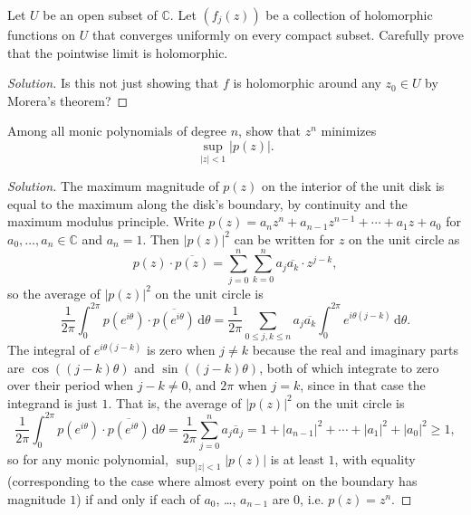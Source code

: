 \documentclass[10pt]{article}
\providecommand{\ol}{\overline}
\newcommand{\dd}{\,\mathrm{d}}
\providecommand{\CC}{\mathbb C}
\newenvironment{soln}{\begin{proof}[Solution]}{\end{proof}}
\providecommand{\abs}[1]{\left\lvert #1\right\rvert}
\begin{document}
\begin{problem}
[2026 J-II-4]
Let $U$ be an open subset of $\mathbb{C}$. Let $(f_j(z))$ be a collection of holomorphic functions on $U$ that converges uniformly on every compact subset. Carefully prove that the pointwise limit is holomorphic.
\end{problem}

\begin{soln}
    Is this not just showing that $f$ is holomorphic
    around any $z_0\in U$ by Morera's theorem?
\end{soln}



\begin{problem}
[2025 A-I-3]
Among all monic polynomials of degree $n$, show that $z^n$ minimizes
$$
\sup_{|z|<1}|p(z)|.
$$
\end{problem}

\begin{soln}
    The maximum magnitude of $p(z)$ on the interior of the unit disk
    is equal to the maximum along the disk's boundary,
    by continuity and the maximum modulus principle.
    Write $p(z) = a_nz^n + a_{n-1}z^{n-1} + \cdots + a_1z + a_0$
    for $a_0,\dots,a_n\in\CC$ and $a_n = 1$.
    Then $\abs{p(z)}^2$ can be written for $z$ on the unit circle as
    \begin{equation*}
	p(z)\cdot\ol{p(z)}
	= \sum_{j=0}^n\sum_{k=0}^n a_j\ol{a_k}\cdot z^{j-k},
    \end{equation*}
    so the average of $\abs{p(z)}^2$ on the unit circle is
    \begin{equation*}
	\frac 1{2\pi}\int_0^{2\pi}
	p(e^{i\theta})\cdot\ol{p(e^{i\theta})}\dd\theta
	= \frac 1{2\pi}\sum_{0\le j,k\le n}a_j\ol{a_k}\int_0^{2\pi}
	e^{i\theta(j-k)}\dd\theta.
    \end{equation*}
    The integral of $e^{i\theta(j-k)}$ is zero when $j\ne k$
    because the real and imaginary parts are
    $\cos((j-k)\theta)$ and $\sin((j-k)\theta)$,
    both of which integrate to zero over their period when $j-k\ne 0$,
    and $2\pi$ when $j = k$, since in that case
    the integrand is just $1$. That is, the average of $\abs{p(z)}^2$
    on the unit circle is
    \begin{equation*}
	\frac 1{2\pi}\int_0^{2\pi}
	p(e^{i\theta})\cdot\ol{p(e^{i\theta})}\dd\theta
	= \frac 1{2\pi}\sum_{j=0}^n a_j\ol a_j
	= 1 + \abs{a_{n-1}}^2 + \cdots + \abs{a_1}^2 + \abs{a_0}^2
	\ge 1,
    \end{equation*}
    so for any monic polynomial,
    $\sup_{\abs{z} < 1}\abs{p(z)}$ is at least $1$,
    with equality (corresponding to the case where
    almost every point on the boundary has magnitude $1$)
    if and only if each of $a_0$, \dots, $a_{n-1}$ are $0$,
    i.e. $p(z) = z^n$.
\end{soln}
\end{document}
